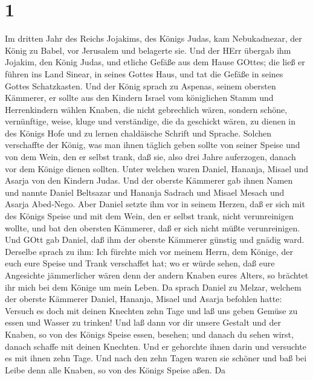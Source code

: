 \hypertarget{section}{%
\section{1}\label{section}}

 Im dritten Jahr des Reichs Jojakims, des Königs Judas, kam
Nebukadnezar, der König zu Babel, vor Jerusalem und belagerte sie.
 Und der HErr übergab ihm Jojakim, den König Judas, und
etliche Gefäße aus dem Hause GOttes; die ließ er führen ins Land Sinear,
in seines Gottes Haus, und tat die Gefäße in seines Gottes Schatzkasten.
 Und der König sprach zu Aspenas, seinem obersten Kämmerer,
er sollte aus den Kindern Israel vom königlichen Stamm und Herrenkindern
wählen  Knaben, die nicht gebrechlich wären, sondern schöne,
vernünftige, weise, kluge und verständige, die da geschickt wären, zu
dienen in des Königs Hofe und zu lernen chaldäische Schrift und Sprache.
 Solchen verschaffte der König, was man ihnen täglich geben
sollte von seiner Speise und von dem Wein, den er selbst trank, daß sie,
also drei Jahre auferzogen, danach vor dem Könige dienen sollten.
 Unter welchen waren Daniel, Hananja, Misael und Asarja von
den Kindern Judas.  Und der oberste Kämmerer gab ihnen Namen
und nannte Daniel Beltsazar und Hananja Sadrach und Misael Mesach und
Asarja Abed-Nego.  Aber Daniel setzte ihm vor in seinem
Herzen, daß er sich mit des Königs Speise und mit dem Wein, den er
selbst trank, nicht verunreinigen wollte, und bat den obersten Kämmerer,
daß er sich nicht müßte verunreinigen.  Und GOtt gab Daniel,
daß ihm der oberste Kämmerer günstig und gnädig ward. 
Derselbe sprach zu ihm: Ich fürchte mich vor meinem Herrn, dem Könige,
der euch eure Speise und Trank verschaffet hat; wo er würde sehen, daß
eure Angesichte jämmerlicher wären denn der andern Knaben eures Alters,
so brächtet ihr mich bei dem Könige um mein Leben.  Da
sprach Daniel zu Melzar, welchem der oberste Kämmerer Daniel, Hananja,
Misael und Asarja befohlen hatte:  Versuch es doch mit
deinen Knechten zehn Tage und laß uns geben Gemüse zu essen und Wasser
zu trinken!  Und laß dann vor dir unsere Gestalt und der
Knaben, so von des Königs Speise essen, besehen; und danach du sehen
wirst, danach schaffe mit deinen Knechten.  Und er
gehorchte ihnen darin und versuchte es mit ihnen zehn Tage.
 Und nach den zehn Tagen waren sie schöner und baß bei
Leibe denn alle Knaben, so von des Königs Speise aßen.  Da
